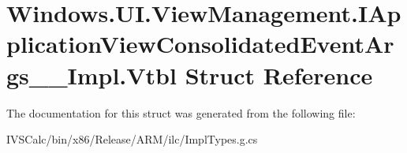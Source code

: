 \hypertarget{struct_windows_1_1_u_i_1_1_view_management_1_1_i_application_view_consolidated_event_args_____impl_1_1_vtbl}{}\section{Windows.\+U\+I.\+View\+Management.\+I\+Application\+View\+Consolidated\+Event\+Args\+\_\+\+\_\+\+Impl.\+Vtbl Struct Reference}
\label{struct_windows_1_1_u_i_1_1_view_management_1_1_i_application_view_consolidated_event_args_____impl_1_1_vtbl}


The documentation for this struct was generated from the following file\+:\begin{DoxyCompactItemize}
\item 
I\+V\+S\+Calc/bin/x86/\+Release/\+A\+R\+M/ilc/Impl\+Types.\+g.\+cs\end{DoxyCompactItemize}
